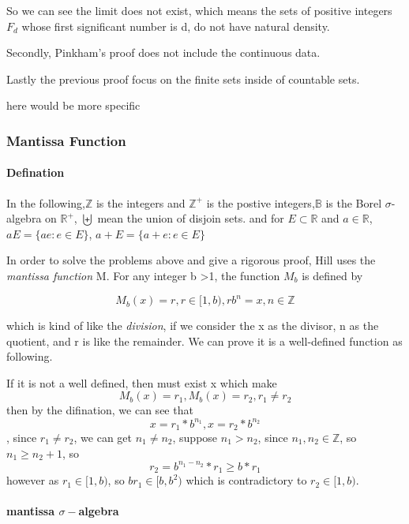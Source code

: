 \documentclass[12pt]{article}
\begin{document}
So we can see the limit does not exist, which means the sets of positive integers $F_d$ whose first significant number is d, do not have natural density. 

Secondly, Pinkham's proof does not include the continuous data. 


Lastly the previous proof focus on the finite sets inside of countable sets. 

here would be more specific
\subsubsection{Mantissa Function}
\paragraph{Defination}
In the following,$\mathbb{Z}$ is the integers and $\mathbb{Z}^+$ is the postive integers,$\mathbb{B}$ is the Borel $\sigma$-algebra on $\mathbb{R}^+$, $\biguplus$ mean the union of disjoin sets. and for $E\subset\mathbb R$ and $a\in \mathbb R$, $aE=\{ae:e\in E\}$, $a+E=\{a+e:e\in E\}$



In order to solve the problems above and give a rigorous proof, Hill uses the \emph{mantissa function} M. For any integer b >1, the function $M_b$ is defined by 

$$M_b(x)=r, r\in [1,b), rb^n=x, n\in \mathbb{Z}$$

which is kind of like the \emph{division}, if we consider the x as the divisor, n as the quotient, and r is like the remainder. We can prove it is a well-defined function as following.

If it is not a well defined, then must exist x which make 
$$M_b(x)=r_1, M_b(x)=r_2,r_1\neq r_2$$ 
then by the difination, we can see that 
$$x=r_1*b^{n_1},x=r_2*b^{n_2}$$,
since $r_1\neq r_2$, we can get $n_1\neq n_2$, suppose $n_1 > n_2$, since $n_1,n_2 \in \mathbb{Z}$, so $n_1 \geq n_2+1$, so 
$$r_2=b^{n_1-n_2}*r_1\geq b*r_1$$
 however as $r_1\in [1,b)$, so $br_1\in [b,b^2)$ which is contradictory to $r_2\in [1,b)$.

\paragraph{mantissa $\sigma-$algebra}
\end{document}
